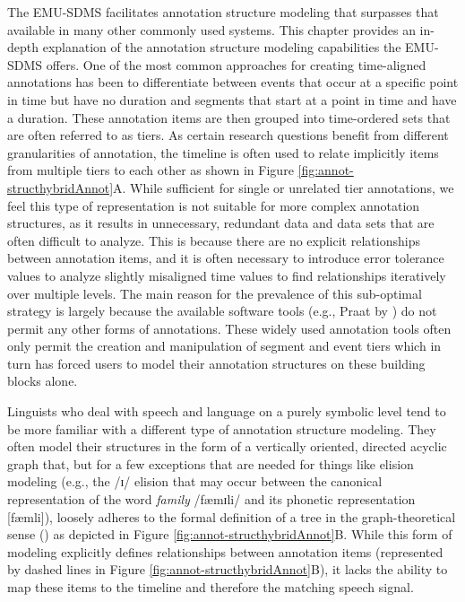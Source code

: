 \documentclass[
]{book}
\begin{document}
The EMU-SDMS facilitates annotation structure modeling that surpasses that available in many other commonly used systems. This chapter provides an in-depth explanation of the annotation structure modeling capabilities the EMU-SDMS offers. One of the most common approaches for creating time-aligned annotations has been to differentiate between events that occur at a specific point in time but have no duration and segments that start at a point in time and have a duration. These annotation items are then grouped into time-ordered sets that are often referred to as tiers. As certain research questions benefit from different granularities of annotation, the timeline is often used to relate implicitly items from multiple tiers to each other as shown in Figure \ref{fig:annot-structhybridAnnot}A. While sufficient for single or unrelated tier annotations, we feel this type of representation is not suitable for more complex annotation structures, as it results in unnecessary, redundant data and data sets that are often difficult to analyze. This is because there are no explicit relationships between annotation items, and it is often necessary to introduce error tolerance values to analyze slightly misaligned time values to find relationships iteratively over multiple levels. The main reason for the prevalence of this sub-optimal strategy is largely because the available software tools (e.g., Praat by \citet{boersma:2011a}) do not permit any other forms of annotations. These widely used annotation tools often only permit the creation and manipulation of segment and event tiers which in turn has forced users to model their annotation structures on these building blocks alone.

Linguists who deal with speech and language on a purely symbolic level tend to be more familiar with a different type of annotation structure modeling. They often model their structures in the form of a vertically oriented, directed acyclic graph that, but for a few exceptions that are needed for things like elision modeling (e.g., the /ɪ/ elision that may occur between the canonical representation of the word \emph{family} /fæmɪli/ and its phonetic representation {[}fæmli{]}), loosely adheres to the formal definition of a tree in the graph-theoretical sense (\citet{knuth:ar1968a}) as depicted in Figure \ref{fig:annot-structhybridAnnot}B. While this form of modeling explicitly defines relationships between annotation items (represented by dashed lines in Figure \ref{fig:annot-structhybridAnnot}B), it lacks the ability to map these items to the timeline and therefore the matching speech signal.
\end{document}
